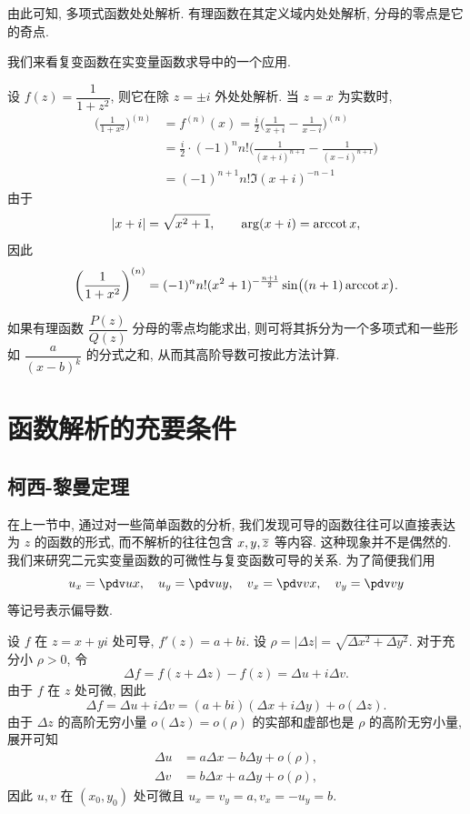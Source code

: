 由此可知, 多项式函数处处解析. 有理函数在其定义域内处处解析, 分母的零点是它的奇点.

我们来看复变函数在实变量函数求导中的一个应用.
\begin{example}
  设 $f(z)=\dfrac1{1+z^2}$, 则它在除 $z=\pm i$ 外处处解析.
  当 $z=x$ 为实数时,
  \begin{align*}
    \biggl(\frac1{1+x^2}\biggr)^{(n)}&
      =f^{(n)}(x)=\frac i2\biggl(\frac1{x+i}-\frac1{x-i}\biggr)^{(n)}\\
    &=\frac i2\cdot(-1)^n n!\biggl(\frac1{(x+i)^{n+1}}-\frac1{(x-i)^{n+1}}\biggr)\\
    &=(-1)^{n+1}n!\Im{(x+i)^{-n-1}}
  \end{align*}
  由于
  \[
    |x+i|=\sqrt{x^2+1},\qquad
    \arg(x+i)=\operatorname{arccot} x,
  \]
  因此
  \[
    \biggl(\frac1{1+x^2}\biggr)^{(n)}
    =(-1)^nn!(x^2+1)^{-\frac{n+1}2}\sin\bigl((n+1)\operatorname{arccot} x\bigr).
  \]
\end{example}
如果有理函数 $\dfrac{P(z)}{Q(z)}$ 分母的零点均能求出, 则可将其拆分为一个多项式和一些形如 $\dfrac{a}{(x-b)^k}$ 的分式之和, 从而其高阶导数可按此方法计算.

\section{函数解析的充要条件}

\subsection{柯西-黎曼定理}

在上一节中, 通过对一些简单函数的分析, 我们发现可导的函数往往可以直接表达为 $z$ 的函数的形式, 而不解析的往往包含 $x,y,\overline z$ 等内容.
这种现象并不是偶然的.
我们来研究二元实变量函数的可微性与复变函数可导的关系.
为了简便我们用
\[
  u_x=\pdv ux,\quad
  u_y=\pdv uy,\quad
  v_x=\pdv vx,\quad
  v_y=\pdv vy
\]
等记号表示偏导数.

设 $f$ 在 $z=x+yi$ 处可导, $f'(z)=a+bi$.
设 $\rho=|\Delta z|=\sqrt{\Delta x^2+\Delta y^2}$.
对于充分小 $\rho>0$, 令
\[
   \Delta f
  =f(z+\Delta z)-f(z)
  =\Delta u+i\Delta v.
\]
由于 $f$ 在 $z$ 处可微, 因此
\[
   \Delta f
  =\Delta u+i\Delta v
  =(a+bi)(\Delta x+i\Delta y)+o(\Delta z).
\]
由于 $\Delta z$ 的高阶无穷小量 $o(\Delta z)=o(\rho)$ 的实部和虚部也是 $\rho$ 的高阶无穷小量, 展开可知
\begin{align*}
  \Delta u&=a\Delta x-b\Delta y+o(\rho),\\
  \Delta v&=b\Delta x+a\Delta y+o(\rho),
\end{align*}
因此 $u,v$ 在 $(x_0,y_0)$ 处可微且 $u_x=v_y=a,v_x=-u_y=b$.

